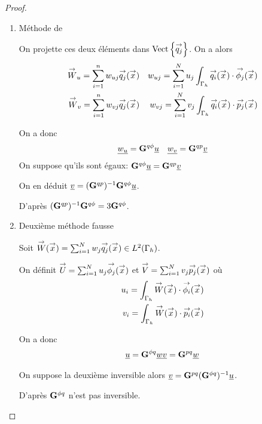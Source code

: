     \begin{proof}
    ~

    \begin{enumerate}
      \item Méthode de \cite{stupfel_implementation_2015}

        On projette ces deux éléments dans \(\Vect{\qj}\).
        On a alors
        \begin{align*}
          \vect{W}_u = \sum_{i=1}^n w_{uj} \qj(\vx) && w_{uj} = \sum_{i=1}^N u_j \int_{\Gamma_h}\qi(\vx) \cdot \phij(\vx)
          \\
          \vect{W}_v = \sum_{i=1}^n w_{vj} \qj(\vx) && w_{vj} = \sum_{i=1}^N v_j \int_{\Gamma_h}\qi(\vx) \cdot \pj(\vx)
        \end{align*}

        On a donc
        \begin{align*}
          \comp{w_u} = \mG{q}{\phi}\comp{u} 
          && 
          \comp{w_v} =\mG{q}{p}\comp{v}
        \end{align*}
        On suppose qu'ils sont égaux: \(\mG{q}{\phi}\comp{u} = \mG{q}{p}\comp{v}\)

        On en déduit \(\comp{v} = (\mG{q}{p})^{-1}\mG{q}{\phi}  \comp{u} \).

        D’après \cite{stupfel_implementation_2015} \((\mG{q}{p})^{-1}\mG{q}{\phi} = 3 \mG{q}{\phi}\).

      \item{Deuxième méthode fausse}

        Soit \(\vect{W}(\vx) = \sum_{i=1}^N w_j \qj(\vx) \in L^2(\Gamma_h)\).

        On définit \(\vect{U}= \sum_{i=1}^N u_j \phij(\vx)\) et \(\vect{V} = \sum_{i=1}^N v_j \pj(\vx)\) où
        \begin{align*}
          u_i = \int_{\Gamma_h} \vect{W}(\vx)\cdot\phii(\vx)
          \\
          v_i = \int_{\Gamma_h} \vect{W}(\vx)\cdot\pii(\vx)
        \end{align*}

        On a donc
        \begin{align*}
          \comp{u}=\mG{\phi}{q}\comp{w}
          \comp{v}=\mG{p}{q}\comp{w}
        \end{align*}

        On suppose la deuxième inversible alors  \(\comp{v} =\mG{p}{q} (\mG{\phi}{q})^{-1} \comp{u} \).

        D’après \cite{stupfel_implementation_2015} \(\mG{\phi}{q}\)  n'est pas inversible.
      \end{enumerate}
      \end{proof}

